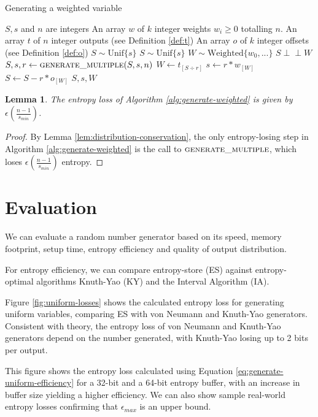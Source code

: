 \documentclass[12pt]{article}
\newtheorem{lemma}{Lemma}
\newcommand{\indep}{\perp\!\!\!\perp}
\newcommand{\unif}[1]{\mathrm{Unif}\{#1\}}
\begin{document}
\begin{algorithm}
\caption{Generating a weighted variable}
\label{alg:generate-weighted}
\begin{algorithmic}[1]
\Require $S, s$ and $n$ are integers
\Require An array $w$ of $k$ integer weights $w_i \ge 0$ totalling $n$.
\Require An array $t$ of $n$ integer outputs (see Definition \ref{def:t})
\Require An array $o$ of $k$ integer offsets (see Definition \ref{def:o})
\Require $S \sim \unif{s}$
\Ensure $S \sim \unif{s}$
\Ensure $W \sim \mathrm{Weighted}\{w_0, ...\}$
\Ensure $S \indep W$
    \State $S, s, r \gets \textsc{generate\_multiple}(S, s, n)$
    \State $W \gets t_{[S \div r]}$
    \State $s \gets r * w_{[W]}$
    \State $S \gets S - r * o_{[W]}$
    \State \Return $S, s, W$
\EndProcedure
\end{algorithmic}
\end{algorithm}

\begin{lemma}
    The entropy loss of Algorithm \ref{alg:generate-weighted} is given by $\epsilon(\frac{n-1}{s_{min}})$.
\end{lemma}

\begin{proof}
    By Lemma \ref{lem:distribution-conservation}, the only entropy-losing step in Algorithm \ref{alg:generate-weighted} is the call to $\textsc{generate\_multiple}$, which loses $\epsilon(\frac{n-1}{s_{min}})$ entropy.
\end{proof}

\section {Evaluation}

We can evaluate a random number generator based on its speed, memory footprint, setup time, entropy efficiency and quality of output distribution. \cite{saad2025}

For entropy efficiency, we can compare entropy-store (ES) against entropy-optimal algorithms Knuth-Yao (KY) and the Interval Algorithm (IA).

Figure \ref{fig:uniform-losses} shows the calculated entropy loss for generating uniform variables, comparing ES with von Neumann and Knuth-Yao generators. Consistent with theory, the entropy loss of von Neumann and Knuth-Yao generators depend on the number generated, with Knuth-Yao losing up to 2 bits per output.

This figure shows the entropy loss calculated using Equation \ref{eq:generate-uniform-efficiency} for a 32-bit and a 64-bit entropy buffer, with an increase in buffer size yielding a higher efficiency. We can also show sample real-world entropy losses confirming that $\epsilon_{max}$ is an upper bound.
\end{document}
